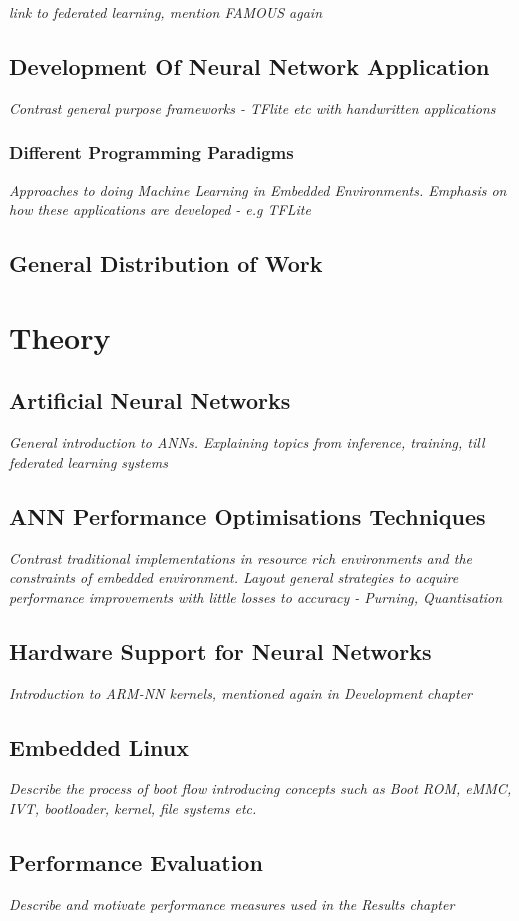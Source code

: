 \textit{link to federated learning, mention FAMOUS again}

\section[Development of Neural Network Application]{Development Of Neural Network Application}
\textit{Contrast general purpose frameworks - TFlite etc with handwritten applications}

\subsection{Different Programming Paradigms}
\textit{Approaches to doing Machine Learning in Embedded Environments. Emphasis on how these applications are developed - e.g TFLite}

\section{General Distribution of Work}

\chapter{Theory}

\section[Artificial Neural Network (ANN)]{Artificial Neural Networks}
\textit{General introduction to ANNs. Explaining topics from inference, training, till federated learning systems}

\section{ANN Performance Optimisations Techniques}
\textit{Contrast traditional implementations in resource rich environments and the constraints of embedded environment. Layout general strategies to acquire performance improvements with little losses to accuracy - Purning, Quantisation}

\section{Hardware Support for Neural Networks}
\textit{Introduction to ARM-NN kernels, mentioned again in Development chapter}

\section{Embedded Linux}
\textit{Describe the process of boot flow introducing concepts such as Boot ROM, eMMC, IVT, bootloader, kernel, file systems etc.}

\section{Performance Evaluation}
\textit{Describe and motivate performance measures used in the Results chapter}
